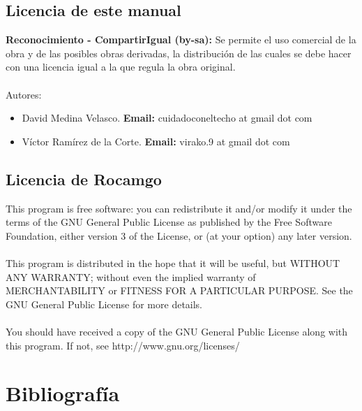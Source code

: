 \documentclass[12pt,a4paper]{report}
\begin{document}
\section{Licencia de este manual}

\textbf{Reconocimiento - CompartirIgual (by-sa):} Se permite el uso comercial de la obra y de las posibles obras derivadas, la distribución de las cuales se debe hacer con una licencia igual a la que regula la obra original. \\ \\


Autores: 
\begin{itemize}
\item David Medina Velasco. \textbf{Email:} cuidadoconeltecho at gmail dot com 
\item Víctor Ramírez de la Corte. \textbf{Email:} virako.9 at gmail dot com
\end{itemize}

\section{Licencia de Rocamgo}

This program is free software: you can redistribute it and/or modify it under the terms of the GNU General Public License as published by the Free Software Foundation, either version 3 of the License, or (at your option) any later version. \\
\\
This program is distributed in the hope that it will be useful, but WITHOUT ANY WARRANTY; without even the implied warranty of MERCHANTABILITY or FITNESS FOR A PARTICULAR PURPOSE.  See the GNU General Public License for more details. \\
\\
You should have received a copy of the GNU General Public License along with this program.  If not, see http://www.gnu.org/licenses/



\chapter{Bibliografía}
\end{document}
